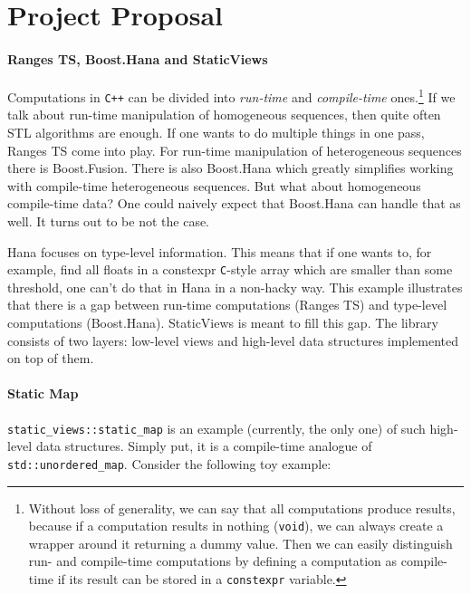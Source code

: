\documentclass[a4paper,12pt]{article}
\begin{document}
\newpage
\section*{Project Proposal}
    \paragraph{Ranges TS, Boost.Hana and StaticViews} Computations in
    \texttt{C++} can be divided into \textit{run-time} and \textit{compile-time}
    ones.\footnote{%
        Without loss of generality, we can say that all computations produce
        results, because if a computation results in nothing (\texttt{void}), we
        can always create a wrapper around it returning a dummy value. Then we
        can easily distinguish run- and compile-time computations by defining a
        computation as compile-time if its result can be stored in a
        \texttt{constexpr} variable.%
    }
    If we talk about run-time manipulation of homogeneous sequences, then quite
    often STL algorithms\cite{stl-algorithms} are enough. If one wants to do
    multiple things in one pass, Ranges TS\cite{ranges-ts} come into play. For
    run-time manipulation of heterogeneous sequences there is
    Boost.Fusion\cite{boost-fusion}. There is also Boost.Hana\cite{boost-hana}
    which greatly simplifies working with compile-time heterogeneous sequences.
    But what about homogeneous compile-time data? One could naively expect that
    Boost.Hana can handle that as well. It turns out to be not the case.

    Hana focuses on type-level information. This means that if one wants to, for
    example, find all floats in a constexpr \texttt{C}-style array which are
    smaller than some threshold, one can't do that in Hana in a non-hacky way.
    This example illustrates that there is a gap between run-time computations
    (Ranges TS) and type-level computations (Boost.Hana). StaticViews is meant
    to fill this gap. The library consists of two layers: low-level views and
    high-level data structures implemented on top of them.

    \paragraph{Static Map} \texttt{static\_views::static\_map} is an example
    (currently, the only one) of such high-level data structures. Simply put, it
    is a compile-time analogue of \texttt{std::unordered\_map}. Consider the
    following toy example:
\end{document}
